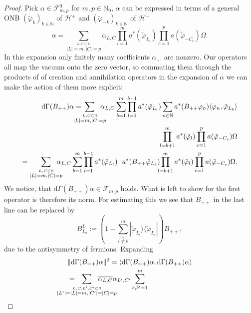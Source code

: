 \documentclass[b5paper,draft,openbib,12pt]{memoir}
\begin{document}
\begin{proof}
Pick \(\alpha\in\mathcal{F}^0_{m,p}\) for \(m,p\in\mathbb{N}_0\), \(\alpha\) can be expressed in terms of a general ONB 
\((\tilde{\varphi}_k)_{k\in\mathbb{N}}\) of \(\mathcal{H}^+\) and \((\tilde{\varphi}_{-k})_{k\in\mathbb{N}}\) of \(\mathcal{H}^-\)
\begin{equation}
\alpha=\sum_{\overset{L,C\subset \mathbb{N}}{|L|=m,|C|=p}}\!\!\!\!\!\!\alpha_{L,C} \prod_{l=1}^m a^*(\tilde{\varphi}_{L_l}) \prod_{c=1}^p a(\tilde{\varphi}_{-C_c}) \Omega.
\end{equation}
In this expansion only finitely many coefficients \(\alpha_{\cdot, \cdot}\) are nonzero. Our operators all map the vacuum onto the zero vector, so commuting them 
through the products of of creation and annihilation operators in the expansion of \(\alpha\) we can make the action of them more explicit:
\begin{align}\nonumber
\mathrm{d}\Gamma(B_{++}) \alpha =\hspace{-0.5cm} \sum_{\overset{L,C\subset \mathbb{N}}{|L|=m,|C|=p}}\!\!\!\!\!\!\alpha_{L,C} \sum_{b=1}^m 
\prod_{l=1}^{b-1} a^*(\tilde{\varphi}_{L_l})  \sum_{n\in\mathbb{N}} a^*(B_{++}\varphi_n) \langle \varphi_n, \tilde{\varphi}_{L_b}\rangle \\
\prod_{l=b+1}^m a^*(\tilde{\varphi}_{l}) \prod_{c=1}^p a(\tilde{\varphi}_{-C_c}) \Omega\\
=\sum_{\overset{L,C\subset \mathbb{N}}{|L|=m,|C|=p}}\!\!\!\!\!\!\alpha_{L,C} \sum_{b=1}^m 
\prod_{l=1}^{b-1} a^*(\tilde{\varphi}_{L_l})  ~~ a^*(B_{++} \tilde{\varphi}_{L_b})  \!\!\!
\prod_{l=b+1}^m a^*(\tilde{\varphi}_{l}) \prod_{c=1}^p a(\tilde{\varphi}_{-C_c}) \Omega.
\end{align}
We notice, that \(\mathrm{d}\Gamma(B_{++})\alpha \in \mathcal{F}_{m,p}\) holds. What is left to show for the first operator is therefore
its norm. For estimating this we see that \(B_{++}\) in the last line can be replaced by 
\begin{equation}
B^L_{L_b}:=\left(1-\sum_{\overset{l=1}{l\neq b}}^m |\tilde{\varphi}_{L_l}\rangle \langle \tilde{\varphi}_{L_l}|\right) B_{++},
\end{equation}
due to the antisymmetry of fermions. Expanding 
\begin{align}\nonumber
&\|\mathrm{d}\Gamma(B_{++})\alpha\|^2 = \langle \mathrm{d}\Gamma(B_{++})\alpha, \mathrm{d}\Gamma(B_{++})\alpha \rangle \\\nonumber
&= \hspace{-1cm}\sum_{\overset{L,C, L',C'\subset \mathbb{N}}{|L'|=|L|=m,|C'|=|C|=p}}\hspace{-1cm}\overline{\alpha_{L,C}}\alpha_{L',C'} \sum_{b,b'=1}^m 

\end{align}
\end{proof}
\end{document}
